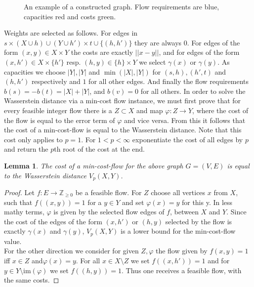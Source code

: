 \documentclass[11pt, a4paper,draft]{report}
\newtheorem{lemma}{Lemma}
\newcommand{\bZ}{\mathbb{Z}}
\newcommand{\im}{\textrm{im}}
\begin{document}
\begin{figure}
\begin{tikzpicture}[scale = .95]
        \end{tikzpicture}
        \caption{An example of a constructed graph.
        Flow requirements are blue, capacities red and costs green.}
        \label{fig7}
    \end{figure}

    Weights are selected as follows.
    For edges in ${s}\times (X\cup h) \cup (Y\cup h')\times t \cup \{(h,h')\}$ they are always 0.
    For edges of the form $(x,y)\in X\times Y$ the costs are exactly $||x-y||$, and for edges of the form $(x,h')\in X\times \{h'\}$ resp. $(h,y)\in \{h\}\times Y$ we select $\gamma(x)$ or $\gamma(y)$.
    As capacities we choose $|Y|,|Y|$ and $\min(|X|,|Y|)$ for $(s,h),(h',t)$ and $(h,h')$ respectively and $1$ for all other edges.
    And finally the flow requirements $b(s) = -b(t) = |X|+|Y|$, and $b(v)=0$ for all others.
    In order to solve the Wasserstein distance via a min-cost flow instance, we must first prove that for every feasible integer flow there is a $Z\subset X$ and map $\varphi:Z\rightarrow Y$, where the cost of the flow is equal to the error term of $\varphi$ and vice versa.
    From this it follows that the cost of a min-cost-flow is equal to the Wasserstein distance.
    Note that this cost only applies to $p=1$.
    For $1<p<\infty$ exponentiate the cost of all edges by $p$ and return the $p$th root of the cost at the end.

    \begin{lemma}
        The cost of a min-cost-flow for the above graph $G=(V,E)$ is equal to the Wasserstein distance $V_p(X,Y)$.
    \end{lemma}
    \begin{proof}
        Let $f:E\rightarrow \bZ_{\geq0}$ be a feasible flow.
        For $Z$ choose all vertices $x$ from $X$, such that $f((x,y))=1$ for a $y\in Y$ and set $\varphi(x) = y$ for this y.
        In less mathy terms, $\varphi$ is given by the selected flow edges of $f$, between $X$ and $Y$.
        Since the cost of the edges of the form $(x,h')$ or $(h,y)$ selected by the flow is exactly $\gamma(x)$ and $\gamma(y)$, $V_p(X,Y)$ is a lower bound for the min-cost-flow value.\\
        For the other direction we consider for given $Z,\varphi$ the flow given by $f(x,y)=1$ iff $x\in Z$ and$ \varphi(x)=y$.
        For all $x\in X\setminus Z$ we set $f((x,h'))=1$ and for $y\in Y\setminus \im(\varphi)$ we set $f((h,y))=1$.
        Thus one receives a feasible flow, with the same costs.
    \end{proof}
\end{document}
